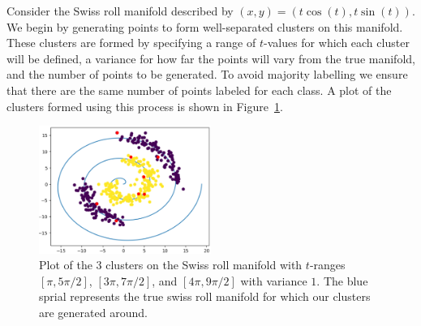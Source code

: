 \documentclass[12pt]{amsart}
\begin{document}
Consider the Swiss roll manifold described by $(x,y) = (t\cos(t), t\sin(t))$. We begin by generating points to form well-separated clusters on this manifold. These clusters are formed by specifying a range of $t$-values for which each cluster will be defined, a variance for how far the points will vary from the true manifold, and the number of points to be generated. To avoid majority labelling we ensure that there are the same number of points labeled for each class. A plot of the clusters formed using this process is shown in Figure~\ref{Fig:SpiOg}.
\begin{figure}
    \centering
    \includegraphics[width=0.5\textwidth]{Figures/SpiOg.png}
    \caption{
        Plot of the 3 clusters on the Swiss roll manifold with $t$-ranges $[\pi,5\pi/2]$, $[3\pi,7\pi/2]$, and $[4\pi,9\pi/2]$ with variance $1$. The blue sprial represents the true swiss roll manifold for which our clusters are generated around.
    }
	\label{Fig:SpiOg}
\end{figure}
\end{document}

